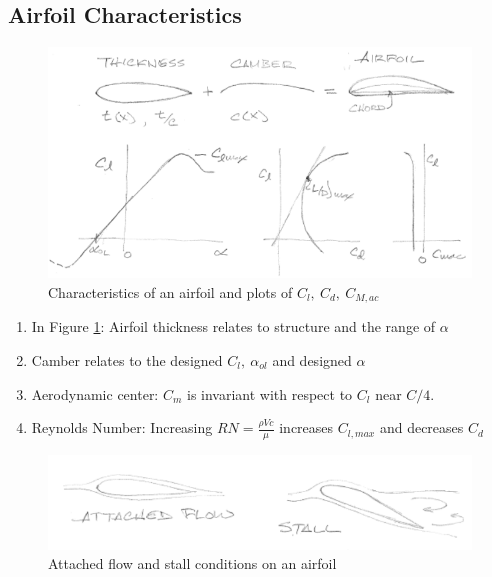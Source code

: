 \documentclass[draft=false, titlepage]{article}
\begin{document}
\subsection{Airfoil Characteristics}
\begin{figure}[ht]
    \centering
    \includegraphics[width=0.7\linewidth]{Figures/airfoilCharacteristics.PNG}
    \caption{Characteristics of an airfoil and plots of $C_l,\ C_d,\ C_{M,ac}$}
    \label{fig:AirfoilCharacteristics}
\end{figure}
\begin{enumerate}
    \item In Figure \ref{fig:AirfoilCharacteristics}: Airfoil thickness relates to structure and the range of $\alpha$
    \item Camber relates to the designed $C_l,\ \alpha_{ol}$ and designed $\alpha$
    \item Aerodynamic center: $C_m$ is invariant with respect to $C_l$ near $C/4$.
    \item Reynolds Number: Increasing $RN = \frac{\rho V c}{\mu}$ increases $C_{l,max}$ and decreases $C_d$
\end{enumerate}
\begin{figure}[ht]
    \centering
    \includegraphics[width=0.6\linewidth]{Figures/airfoilStallFlow.PNG}
    \caption{Attached flow and stall conditions on an airfoil}
    \label{fig:AirfoilStallFlow}
\end{figure}
\end{document}
